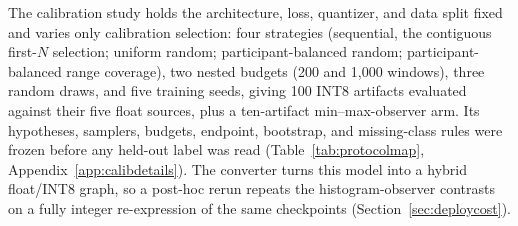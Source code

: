 \documentclass[10pt,twocolumn]{article}
\begin{document}
The calibration study holds the architecture, loss, quantizer, and data
split fixed and varies only calibration selection: four strategies
(sequential, the contiguous first-$N$ selection; uniform random;
participant-balanced random; participant-balanced range coverage), two
nested budgets (200 and 1,000 windows), three random draws, and five
training seeds, giving 100 INT8 artifacts evaluated against their five
float sources, plus a ten-artifact min--max-observer arm. Its hypotheses,
samplers, budgets, endpoint, bootstrap, and missing-class rules were frozen
before any held-out label was read (Table~\ref{tab:protocolmap},
Appendix~\ref{app:calibdetails}). The converter turns this model into a
hybrid float/INT8 graph, so a post-hoc rerun repeats the
histogram-observer contrasts on a fully integer re-expression of the same
checkpoints
(Section~\ref{sec:deploycost}).
\end{document}
